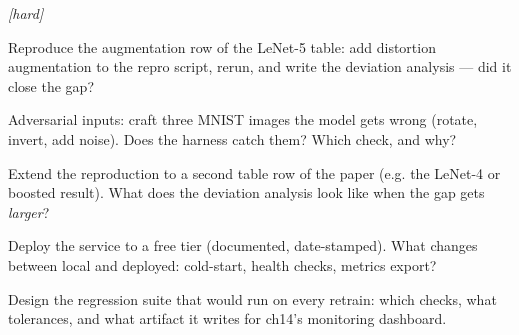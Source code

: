 \emph{[hard]}
\begin{exercise}
Reproduce the augmentation row of the LeNet-5 table: add
distortion augmentation to the repro script, rerun, and write the
deviation analysis --- did it close the gap?
\end{exercise}
\begin{exercise}
Adversarial inputs: craft three MNIST images the model gets wrong
(rotate, invert, add noise). Does the harness catch them? Which
check, and why?
\end{exercise}
\begin{exercise}
Extend the reproduction to a second table row of the paper (e.g.
the LeNet-4 or boosted result). What does the deviation analysis
look like when the gap gets \emph{larger}?
\end{exercise}
\begin{exercise}
Deploy the service to a free tier (documented, date-stamped). What
changes between local and deployed: cold-start, health checks,
metrics export?
\end{exercise}
\begin{exercise}
Design the regression suite that would run on every retrain:
which checks, what tolerances, and what artifact it writes for
ch14's monitoring dashboard.
\end{exercise}

